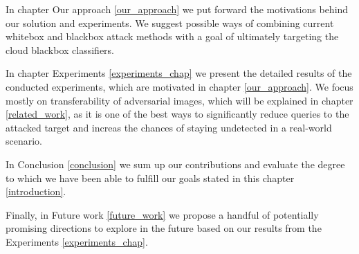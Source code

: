 In chapter Our approach \ref{our_approach} we put forward the motivations behind our solution and experiments. We suggest possible ways of combining current whitebox and blackbox attack methods with a goal of ultimately targeting the cloud blackbox classifiers.

In chapter Experiments \ref{experiments_chap} we present the detailed results of the conducted experiments, which are motivated in chapter \ref{our_approach}. We focus mostly on transferability of adversarial images, which will be explained in chapter \ref{related_work}, as it is one of the best ways to significantly reduce queries to the attacked target and increas the chances of staying undetected in a real-world scenario.

In Conclusion \ref{conclusion} we sum up our contributions and evaluate the degree to which we have been able to fulfill our goals stated in this chapter \ref{introduction}.

Finally, in Future work \ref{future_work} we propose a handful of potentially promising directions to explore in the future based on our results from the Experiments \ref{experiments_chap}.
